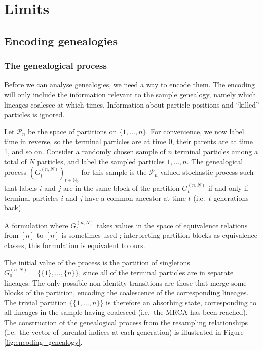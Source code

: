 \chapter{Limits} %


\section{Encoding genealogies}

\subsection{The genealogical process}
Before we can analyse genealogies, we need a way to encode them.
The encoding will only include the information relevant to the sample genealogy, namely which lineages coalesce at which times. Information about particle positions and ``killed'' particles is ignored.

Let $\mathcal{P}_n$ be the space of partitions on $\{1,\dots,n\}$.
For convenience, we now label time in reverse, so the terminal particles are at time 0, their parents are at time 1, and so on.
Consider a randomly chosen sample of $n$ terminal particles among a total of $N$ particles, and label the sampled particles $1,\dots,n$.
The genealogical process $(G_t^{(n,N)})_{t\in\mathbb{N}_0}$ for this sample is the $\mathcal{P}_n$-valued stochastic process such that labels $i$ and $j$ are in the same block of the partition $G_t^{(n,N)}$ if and only if terminal particles $i$ and $j$ have a common ancestor at time $t$ (i.e.\ $t$ generations back).

A formulation where $G_t^{(n,N)}$ takes values in the space of equivalence relations from $[n]$ to $[n]$ is sometimes used \parencite[e.g.][]{mohle1999}; interpreting partition blocks as equivalence classes, this formulation is equivalent to ours.

The initial value of the process is the partition of singletons $G_0^{(n,N)} = \{ \{1\}, \dots, \{n\} \}$, since all of the terminal particles are in separate lineages.
The only possible non-identity transitions are those that merge some blocks of the partition, encoding the coalescence of the corresponding lineages.
The trivial partition $\{ \{1,\dots,n\} \}$ is therefore an absorbing state, corresponding to all lineages in the sample having coalesced (i.e.\ the MRCA has been reached).
The construction of the genealogical process from the resampling relationships (i.e.\ the vector of parental indices at each generation) is illustrated in Figure \ref{fig:encoding_genealogy}.

